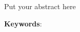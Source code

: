{
    \cleardoublepage%
    \let\clearpage\relax%
    \begin{center}
        \noindent\textbf{\huge\getTitle}
    \end{center}
    \vspace{0.25cm}
    \begin{center}
        \noindent\textbf{\Large\getAuthor}
    \end{center}
    \vspace{-1cm}  
    \chapter*{\centering \abstractname}
} \noindent
Put your abstract here

\noindent\textbf{Keywords}: \getKeywords{}
